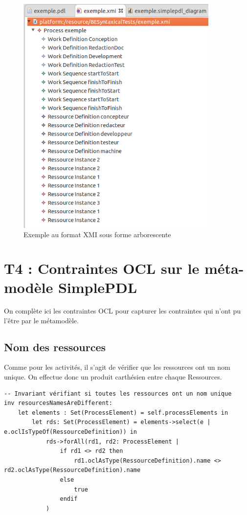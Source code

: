 \documentclass{report}
\begin{document}
\begin{figure}[!h] 
\begin{center}
\includegraphics[width=10cm]{Capture-12.png}
\caption{Exemple au format XMI sous forme arborescente} 
\label{img1} 
\end{center}
\end{figure} 

\newpage

\section{T4 : Contraintes OCL sur le méta-modèle SimplePDL}

On complète ici les contraintes OCL pour capturer les contraintes qui n’ont pu l’être par le métamodèle.

\subsection{Nom des ressources}

Comme pour les activités, il s'agit de vérifier que les ressources ont un nom unique.
On effectue donc un produit carthésien entre chaque Ressources.\\

\begin{verbatim}
-- Invariant vérifiant si toutes les ressources ont un nom unique
inv resourcesNamesAreDifferent:
	let elements : Set(ProcessElement) = self.processElements in
    	let rds: Set(ProcessElement) = elements->select(e | e.oclIsTypeOf(RessourceDefinition)) in
			rds->forAll(rd1, rd2: ProcessElement |
				if rd1 <> rd2 then
					rd1.oclAsType(RessourceDefinition).name <> rd2.oclAsType(RessourceDefinition).name
				else
					true
				endif
			)
\end{verbatim}
\end{document}
